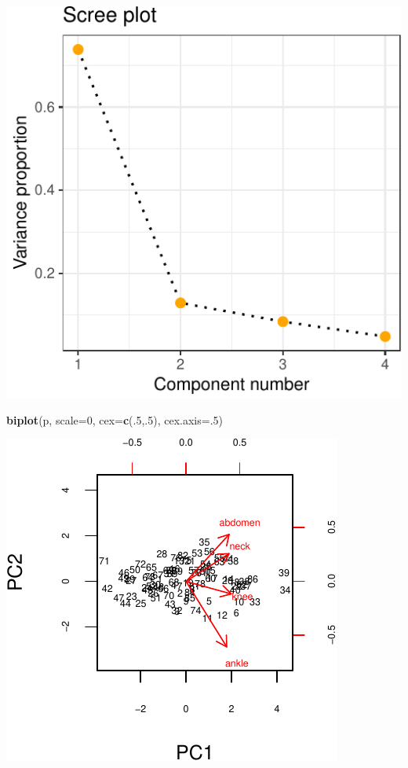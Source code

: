\documentclass[]{article}
\newenvironment{Shaded}{\begin{snugshade}}{\end{snugshade}}
\newcommand{\DataTypeTok}[1]{\textcolor[rgb]{0.13,0.29,0.53}{#1}}
\newcommand{\DecValTok}[1]{\textcolor[rgb]{0.00,0.00,0.81}{#1}}
\newcommand{\KeywordTok}[1]{\textcolor[rgb]{0.13,0.29,0.53}{\textbf{#1}}}
\newcommand{\NormalTok}[1]{#1}
\begin{document}
\begin{center}\includegraphics{sol_A2_files/figure-latex/unnamed-chunk-12-1} \end{center}

\begin{Shaded}
\begin{Highlighting}[]
\KeywordTok{biplot}\NormalTok{(p, }\DataTypeTok{scale=}\DecValTok{0}\NormalTok{, }\DataTypeTok{cex=}\KeywordTok{c}\NormalTok{(.}\DecValTok{5}\NormalTok{,.}\DecValTok{5}\NormalTok{), }\DataTypeTok{cex.axis=}\NormalTok{.}\DecValTok{5}\NormalTok{)}
\end{Highlighting}
\end{Shaded}

\begin{center}\includegraphics{sol_A2_files/figure-latex/unnamed-chunk-12-2} \end{center}
\end{document}
